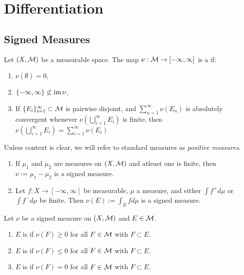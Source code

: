 \chapter{Differentiation}

\section{Signed Measures}
\begin{definition}
    Let $(X,\mathcal{M})$ be a measurable space. The map $\nu:\mathcal{M} \rightarrow [-\infty,\infty]$ is a  if:
        \begin{enumerate}[label = (\arabic*),itemsep=1pt,topsep=3pt]
            \item $\nu(\emptyset) = 0$,
            \item $\{-\infty,\infty\} \not\subset \operatorname{im} \nu$,
            \item If $\{E_i\}_{i = 1}^\infty \subset \mathcal{M}$ is pairwise disjoint, and $\sum_{n = 1}^\infty \nu(E_n)$ is absolutely convergent whenever $\nu \left( \bigcup_{i = 1}^\infty E_i \right)$ is finite, then $\nu \left( \bigcup_{i = 1}^\infty E_i \right) = \sum_{i = 1}^\infty \nu(E_i)$
        \end{enumerate}
\end{definition}

Unless context is clear, we will refer to standard measures as \textit{positive measures}.

\begin{example}
\phantom{a}
\begin{enumerate}[label = (\arabic*),itemsep=1pt,topsep=3pt]
    \item If $\mu_1$ and $\mu_2$ are measures on $(X,\mathcal{M})$ and atleast one is finite, then $\nu:= \mu_1 - \mu_2$ is a signed measure.
    \item Let $f:X \rightarrow [-\infty,\infty]$ be measurable, $\mu$ a measure, and either $\int f^+ d\mu$ or $\int f^{-}d\mu$ be finite. Then $\nu(E) := \int_E f d\mu$ is a signed measure.
\end{enumerate}
\end{example}

\begin{definition}
    Let $\nu$ be a signed measure on $(X,\mathcal{M})$ and $E \in \mathcal{M}$.
    \begin{enumerate}[label = (\arabic*),itemsep=1pt,topsep=3pt]
        \item $E$ is  if $\nu(F) \geq 0$ for all $F \in \mathcal{M}$ with $F \subset E$.
        \item$E$ is  if $\nu(F) \leq 0$ for all $F \in \mathcal{M}$ with $F \subset E$.
        \item $E$ is  if $\nu(F) = 0$ for all $F \in \mathcal{M}$ with $F \subset E$.
    \end{enumerate}
\end{definition}

